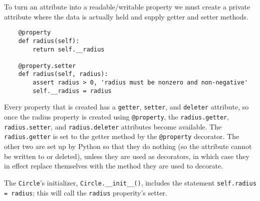 To turn an attribute into a readable/writable property we must create a private attribute where the data is actually held and supply getter and setter methods.
\begin{lstlisting}
    @property
    def radius(self):
        return self.__radius

    @property.setter
    def radius(self, radius):
        assert radius > 0, 'radius must be nonzero and non-negative'
        self.__radius = radius   
\end{lstlisting}


Every property that is created has a \verb|getter|, \verb|setter|, and \verb|deleter| attribute,
so once the radius property is created using \verb|@property|, the \verb|radius.getter|, \verb|radius.setter|, and
\verb|radius.deleter| attributes become available.
The \verb|radius.getter| is set to the getter method by the \verb|@property| decorator.
The other two are set up by Python so that they do nothing (so the attribute cannot be written to or deleted),
unless they are used as decorators, in which case they in effect replace themselves with the method they are used to decorate.


The \verb|Circle|'s initializer, \verb|Circle.__init__()|, includes the statement \verb|self.radius = radius|;
this will call the \verb|radius| properity's setter.



